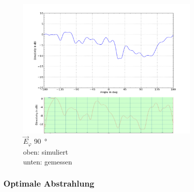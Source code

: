 \begin{figure}[h!]
	\centering
	\includegraphics[width=0.8\textwidth]{../fig/plt/comparison_l4_pcb_v2c_laptop_1a_105_etot_phi90_2ghz4.png}
	\caption{$\vec{E}_{\varphi}$ \;\; \SI{90}{\degree} \\
		\hspace*{107pt}oben: simuliert\\
		\hspace*{115pt}unten: gemessen}
	\label{fig:E_tot_90}
\end{figure}

\clearpage
\subsubsection{Optimale Abstrahlung}

